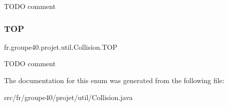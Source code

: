 T\+O\+DO comment \mbox{\label{enumfr_1_1groupe40_1_1projet_1_1util_1_1_collision_a0e45de89c8e4ab6450f428f13330bdf8}} 
\subsubsection{\texorpdfstring{T\+OP}{TOP}}
{\footnotesize\ttfamily fr.\+groupe40.\+projet.\+util.\+Collision.\+T\+OP}

T\+O\+DO comment 

The documentation for this enum was generated from the following file\+:\begin{DoxyCompactItemize}
\item 
src/fr/groupe40/projet/util/Collision.\+java\end{DoxyCompactItemize}
